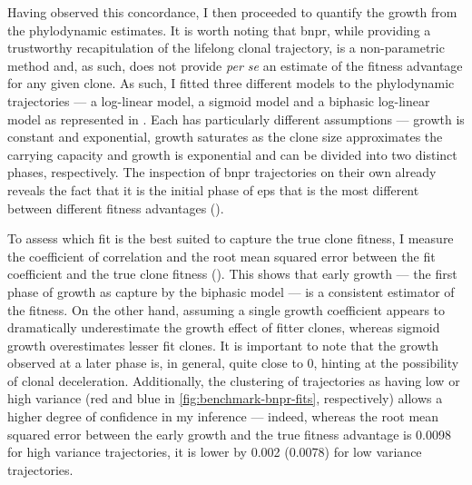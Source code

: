 \begin{figure}[!ht]
	\label{fig:wf-vs-bnpr-traj}
\end{figure}

Having observed this concordance, I then proceeded to quantify the growth from the phylodynamic estimates. It is worth noting that \ac{bnpr}, while providing a trustworthy recapitulation of the lifelong clonal trajectory, is a non-parametric method and, as such, does not provide \textit{per se} an estimate of the fitness advantage for any given clone. As such, I fitted three different models to the phylodynamic trajectories --- a log-linear model, a sigmoid model and a biphasic log-linear model as represented in . Each has particularly different assumptions --- growth is constant and exponential, growth saturates as the clone size approximates the carrying capacity and growth is exponential and can be divided into two distinct phases, respectively. The inspection of \ac{bnpr} trajectories on their own already reveals the fact that it is the initial phase of \ac{eps} that is the most different between different fitness advantages ().

\begin{figure}[!ht]
	\label{fig:models-bnpr-example}
\end{figure}

\begin{figure}[!ht]
	\label{fig:all-simulated-bnpr}
\end{figure}

To assess which fit is the best suited to capture the true clone fitness, I measure the coefficient of correlation and the root mean squared error between the fit coefficient and the true clone fitness (). This shows that early growth --- the first phase of growth as capture by the biphasic model --- is a consistent estimator of the fitness. On the other hand, assuming a single growth coefficient appears to dramatically underestimate the growth effect of fitter clones, whereas sigmoid growth overestimates lesser fit clones. It is important to note that the growth observed at a later phase is, in general, quite close to 0, hinting at the possibility of clonal deceleration. Additionally, the clustering of trajectories as having low or high variance (red and blue in \ref{fig:benchmark-bnpr-fits}, respectively) allows a higher degree of confidence in my inference --- indeed, whereas the root mean squared error between the early growth and the true fitness advantage is 0.0098 for high variance trajectories, it is lower by 0.002 (0.0078) for low variance trajectories. 

